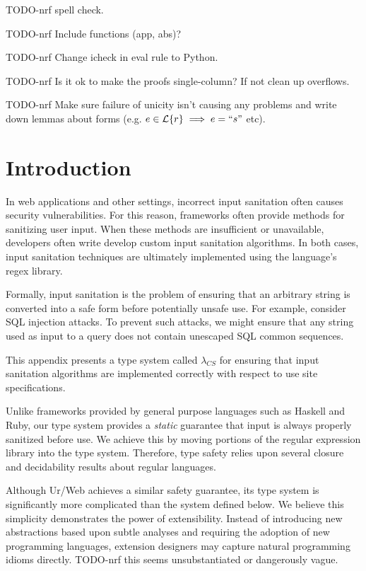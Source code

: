\documentclass[10pt,preprint]{sigplanconf}
\theoremstyle{definition}
\newcommand{\Lagr}{\mathcal{L}}
\newcommand{\lang}[1]{\Lagr\{#1\}}
\newcommand{\strf}[1]{``#1"}
\newcommand{\lcs}{\lambda_{CS}}
\begin{document}
TODO-nrf spell check.

TODO-nrf Include functions (app, abs)?

TODO-nrf Change icheck in eval rule to Python.

TODO-nrf Is it ok to make the proofs single-column? If not clean up overflows.

TODO-nrf Make sure failure of unicity isn't causing any problems and write down lemmas about
forms (e.g. $e \in \lang{r} \implies e = \strf{s}$ etc).

\section{Introduction}
In web applications and other settings, incorrect input sanitation often causes
security vulnerabilities. For this reason, frameworks often provide methods
for sanitizing user input. When these methods are insufficient or unavailable,
developers often write develop custom input sanitation algorithms. In both cases,
input sanitation techniques are ultimately implemented using the language's
regex library.

Formally, input sanitation is the problem of ensuring that an arbitrary string
is converted into a safe form before potentially unsafe use. For example, consider
SQL injection attacks. To prevent such attacks, we might ensure that any string
used as input to a query does not contain unescaped SQL common sequences. 

This appendix presents a type system called $\lcs$ for ensuring that input 
sanitation algorithms are implemented correctly with respect to use site 
specifications.

Unlike frameworks provided by general purpose languages such as Haskell and
Ruby, our type system provides a \emph{static} guarantee that input is always 
properly sanitized before use. We achieve this by moving portions of the regular
expression library into the type system. Therefore, type safety relies upon 
several closure and decidability results about regular languages.

Although Ur/Web achieves a similar safety guarantee, its type system is significantly
more complicated than the system defined below. We believe this simplicity 
demonstrates the power of extensibility. Instead of introducing new abstractions
based upon subtle analyses and requiring the adoption of new programming languages, 
extension designers may capture natural programming idioms directly. TODO-nrf this seems unsubstantiated or dangerously vague.
\end{document}
